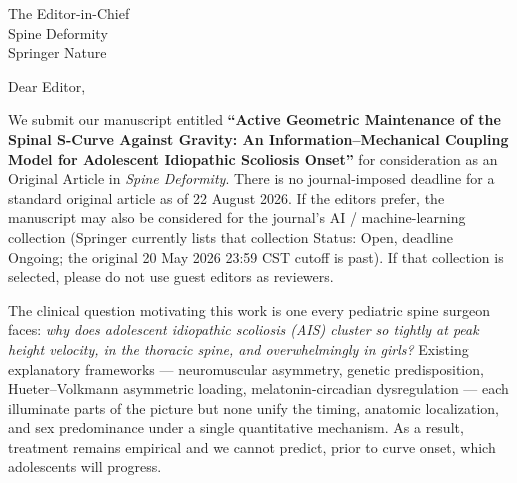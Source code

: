 \documentclass[12pt]{letter}
\begin{document}
\begin{letter}{The Editor-in-Chief\\Spine Deformity\\Springer Nature}

\opening{Dear Editor,}

We submit our manuscript entitled \textbf{``Active Geometric Maintenance of the Spinal S-Curve Against Gravity: An Information--Mechanical Coupling Model for Adolescent Idiopathic Scoliosis Onset''} for consideration as an Original Article in \textit{Spine Deformity}. There is no journal-imposed deadline for a standard original article as of 22 August 2026. If the editors prefer, the manuscript may also be considered for the journal's AI / machine-learning collection (Springer currently lists that collection Status: Open, deadline Ongoing; the original 20 May 2026 23:59 CST cutoff is past). If that collection is selected, please do not use guest editors as reviewers.

The clinical question motivating this work is one every pediatric spine surgeon faces: \textit{why does adolescent idiopathic scoliosis (AIS) cluster so tightly at peak height velocity, in the thoracic spine, and overwhelmingly in girls?} Existing explanatory frameworks --- neuromuscular asymmetry, genetic predisposition, Hueter--Volkmann asymmetric loading, melatonin-circadian dysregulation --- each illuminate parts of the picture but none unify the timing, anatomic localization, and sex predominance under a single quantitative mechanism. As a result, treatment remains empirical and we cannot predict, prior to curve onset, which adolescents will progress.


\end{letter}
\end{document}
